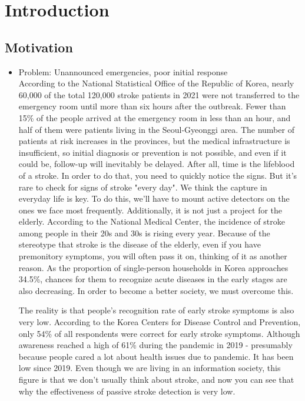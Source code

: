 \section{Introduction}
\subsection{Motivation}
\begin{itemize}
    \item Problem: Unannounced emergencies, poor initial response \\
    \cite{r8}According to the National Statistical Office of the Republic of Korea, nearly 60,000 of the total 120,000 stroke patients in 2021 were not transferred to the emergency room until more than six hours after the outbreak.
Fewer than 15\% of the people arrived at the emergency room in less than an hour, and half of them were patients living in the Seoul-Gyeonggi area.
\cite{r9} The number of patients at risk increases in the provinces, but the medical infrastructure is insufficient, so initial diagnosis or prevention is not possible, and even if it could be, follow-up will inevitably be delayed.
After all, time is the lifeblood of a stroke. In order to do that, you need to quickly notice the signs. But it's rare to check for signs of stroke "every day".
We think the capture in everyday life is key. To do this, we'll have to mount active detectors on the ones we face most frequently.
Additionally, it is not just a project for the elderly. \cite{r8} According to the National Medical Center, the incidence of stroke among people in their 20s and 30s is rising every year.
Because of the stereotype that stroke is the disease of the elderly, even if you have premonitory symptoms, you will often pass it on, thinking of it as another reason.
\cite{r10} As the proportion of single-person households in Korea approaches 34.5\%, chances for them to recognize acute diseases in the early stages are also decreasing. 
In order to become a better society, we must overcome this.

The reality is that people's recognition rate of early stroke symptoms is also very low.
\cite{r11} According to the Korea Centers for Disease Control and Prevention, only 54\% of all respondents were correct for early stroke symptoms.
Although awareness reached a high of 61\% during the pandemic in 2019 - presumably because people cared a lot about health issues due to pandemic.
It has been low since 2019.
Even though we are living in an information society, this figure is that we don't usually think about stroke, and now you can see that why the effectiveness of passive stroke detection is very low.


\end{itemize}
